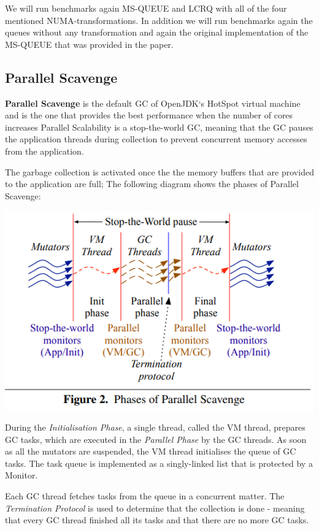 \documentclass{article}
\begin{document}
 We will run benchmarks again MS-QUEUE and LCRQ with all of the four mentioned NUMA-transformations. In addition we will run benchmarks again the queues without any transformation and again the original implementation of the MS-QUEUE that was provided in the paper.

 \subsection{Parallel Scavenge}
 \textbf{Parallel Scavenge} is the default GC of OpenJDK`s HotSpot virtual machine and is the one that provides the best performance when the number of cores increases\cite{paper}
 Parallel Scalability is a stop-the-world GC, meaning that the GC pauses the application threads during collection to prevent concurrent memory accesses from the application.

 The garbage collection is activated once the the memory buffers that are provided to the application are full; The following diagram shows the phases of Parallel Scavenge:

 \includegraphics[width=\textwidth]{gc_phases.png}

 During the \textit{Initialisation Phase}, a single thread, called the VM thread, prepares GC tasks, which are executed in the \textit{Parallel Phase} by the GC threads.
 As soon as all the mutators are suspended, the VM thread initialises the queue of GC tasks. The task queue is implemented as a singly-linked list that is protected by a Monitor.

 Each GC thread fetches tasks from the queue in a concurrent matter. The \textit{Termination Protocol} is used to determine that the collection is done - meaning that every GC thread finished all its tasks and that there are no more GC tasks. 
 
\end{document}
